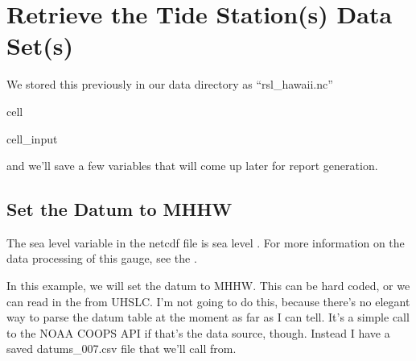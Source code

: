 \documentclass[letterpaper,10pt,english]{jupyterBook}
\begin{document}
\chapter{Retrieve the Tide Station(s) Data Set(s)}
\label{\detokenize{notebooks/FloodFrequency:retrieve-the-tide-station-s-data-set-s}}
\sphinxAtStartPar
We stored this previously in our data directory as “rsl\_hawaii.nc”

\begin{sphinxuseclass}{cell}\begin{sphinxVerbatimInput}

\begin{sphinxuseclass}{cell_input}
\begin{sphinxVerbatim}[commandchars=\\\{\}]
    
\end{sphinxVerbatim}

\end{sphinxuseclass}\end{sphinxVerbatimInput}

\end{sphinxuseclass}
\sphinxAtStartPar
and we’ll save a few variables that will come up later for report generation.


\section{Set the Datum to MHHW}
\label{\detokenize{notebooks/FloodFrequency:set-the-datum-to-mhhw}}
\begin{sphinxShadowBox}

\sphinxAtStartPar
The sea level variable in the netcdf file is sea level . For more information on the data processing of this gauge, see the .
\end{sphinxShadowBox}

\sphinxAtStartPar
In this example, we will set the datum to MHHW. This can be hard coded, or we can read in the  from UHSLC. I’m not going to do this, because there’s no elegant way to parse the datum table at the moment as far as I can tell. It’s a simple call to the NOAA COOPS API if that’s the data source, though. Instead I have a saved datums\_007.csv file that we’ll call from.
\end{document}
